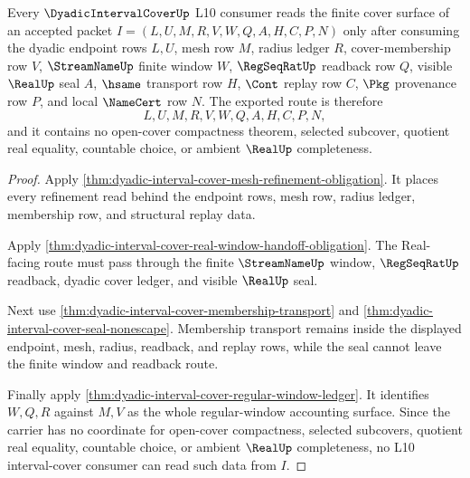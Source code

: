 \begin{theorem}
\label{thm:dyadicintervalcover-l10-window-obligations}
Every $\DyadicIntervalCoverUp$ L10 consumer reads the finite cover surface of an accepted packet $I=(L,U,M,R,V,W,Q,A,H,C,P,N)$ only after consuming the dyadic endpoint rows $L,U$, mesh row $M$, radius ledger $R$, cover-membership row $V$, $\StreamNameUp$ finite window $W$, $\RegSeqRatUp$ readback row $Q$, visible $\RealUp$ seal $A$, $\hsame$ transport row $H$, $\Cont$ replay row $C$, $\Pkg$ provenance row $P$, and local $\NameCert$ row $N$. The exported route is therefore
$$
L,U,M,R,V,W,Q,A,H,C,P,N ,
$$
and it contains no open-cover compactness theorem, selected subcover, quotient real equality, countable choice, or ambient $\RealUp$ completeness.
\end{theorem}
\begin{proof}
Apply \autoref{thm:dyadic-interval-cover-mesh-refinement-obligation}. It places every refinement read behind the endpoint rows, mesh row, radius ledger, membership row, and structural replay data.

Apply \autoref{thm:dyadic-interval-cover-real-window-handoff-obligation}. The Real-facing route must pass through the finite $\StreamNameUp$ window, $\RegSeqRatUp$ readback, dyadic cover ledger, and visible $\RealUp$ seal.

Next use \autoref{thm:dyadic-interval-cover-membership-transport} and \autoref{thm:dyadic-interval-cover-seal-nonescape}. Membership transport remains inside the displayed endpoint, mesh, radius, readback, and replay rows, while the seal cannot leave the finite window and readback route.

Finally apply \autoref{thm:dyadic-interval-cover-regular-window-ledger}. It identifies $W,Q,R$ against $M,V$ as the whole regular-window accounting surface. Since the carrier has no coordinate for open-cover compactness, selected subcovers, quotient real equality, countable choice, or ambient $\RealUp$ completeness, no L10 interval-cover consumer can read such data from $I$.
\end{proof}


